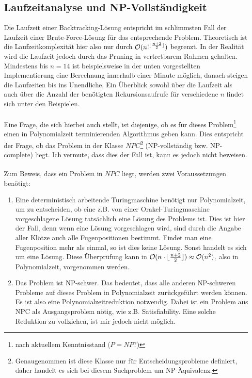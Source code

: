 \documentclass[a4paper, notitlepage, 12pt]{scrartcl}
\DeclarePairedDelimiter\floor{\lfloor}{\rfloor}
\begin{document}
\subsection{Laufzeitanalyse und NP-Vollständigkeit}
Die Laufzeit einer Backtracking-Lösung entspricht im schlimmsten Fall der Laufzeit einer Brute-Force-Lösung für das entsprechende Problem. Theoretisch ist die Laufzeitkomplexität hier also nur durch $\mathcal{O}(n!^{\floor{\frac{n + 2}{2}}})$ begrenzt. In der Realität wird die Laufzeit jedoch durch das Pruning in vertretbarem Rahmen gehalten. Mindestens bis $n = 14$ ist beispielsweise in der unten vorgestellten Implementierung eine Berechnung innerhalb einer Minute möglich, danach steigen die Laufzeiten bis ins Unendliche. Ein Überblick sowohl über die Laufzeit als auch über die Anzahl der benötigten Rekursionsaufrufe für verschiedene $n$ findet sich unter den Beispielen. \\ \\
Eine Frage, die sich hierbei auch stellt, ist diejenige, ob es für dieses Problem\footnote{nach aktuellem Kenntnisstand ($P = NP ?$)} einen in Polynomialzeit terminierenden Algorithmus geben kann. Dies entspricht der Frage, ob das Problem in der Klasse $NPC$\footnote{Genaugenommen ist diese Klasse nur für Entscheidungsprobleme definiert, daher handelt es sich bei diesem Suchproblem um NP-Äquivalenz.} (NP-vollständig bzw. NP-complete) liegt. Ich vermute, dass dies der Fall ist, kann es jedoch nicht beweisen. \\ \\
Zum Beweis, dass ein Problem in $NPC$ liegt, werden zwei Voraussetzungen benötigt:
\begin{enumerate}
\item Eine deterministisch arbeitende Turingmaschine benötigt nur Polynomialzeit, um zu entscheiden, ob eine z.B. von einer Orakel-Turingmaschine vorgeschlagene Lösung tatsächlich eine Lösung des Problems ist. Dies ist hier der Fall, denn wenn eine Lösung vorgeschlagen wird, sind durch die Angabe aller Klötze auch alle Fugenpositionen bestimmt. Findet man eine Fugenposition mehr als einmal, so ist dies keine Lösung. Sonst handelt es sich um eine Lösung. Diese Überprüfung kann in $\mathcal{O}(n \cdot \floor{\frac{n + 2}{2}}) \approx \mathcal{O}(n^2)$, also in Polynomialzeit, vorgenommen werden.
\item Das Problem ist NP-schwer. Das bedeutet, dass alle anderen NP-schweren Probleme auf dieses Problem in Polynomialzeit zurückgeführt werden können. Es ist also eine Polynomialzeitreduktion notwendig. Dabei ist ein Problem aus NPC als Ausgangsproblem nötig, wie z.B. Satisfiability. Eine solche Reduktion zu vollziehen, ist mir jedoch nicht möglich.
\end{enumerate}
\end{document}
